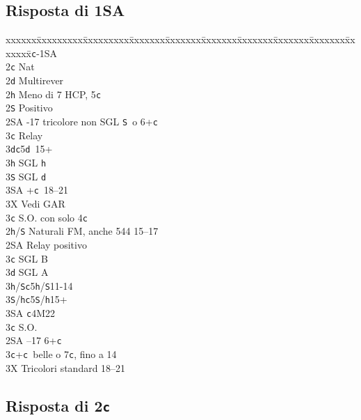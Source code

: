 \documentclass[a4paper,italian]{article}
\newcommand{\BS}{\small{\texttt{S}}}
\newcommand{\BC}{\small{\texttt{c}}}
\newcommand{\BD}{\small{\texttt{d}}}
\newcommand{\BH}{\small{\texttt{h}}}
\newcommand{\pdfc}{\texorpdfstring{\texttt{c}}{C}}
\newenvironment{bidtable}
{\begin{tabbing}

    xxxxxx\=xxxxxxxxx\=xxxxxxxxx\=xxxxxxx\=xxxxxxx\=xxxxxxx\=xxxxxxx\=xxxxxxx\=xxxxxxx\=xxxxxxx\=\kill}
{\end{tabbing} }%
\begin{document}
\begin{multicols}{2}
    \subsection{Risposta di 1SA}

    \begin{bidtable}
        1\BC-1\small{SA}\+\\
        2\BC \> Nat\\
        2\BD \> Multirever\+\\
        2\BH \> Meno di 7 HCP, 5\BC \\
        2\BS \> Positivo\+\\
        2\small{SA} -17 tricolore non SGL \BS\ o 6+\BC \+\\
        3\BC \> Relay\+\\
        3\BD {}\BC5\BD\ 15+\\
        3\BH \> SGL \BH \\
        3\BS \> SGL \BD \\
        3\small{SA} +\BC\ 18--21\-\-\\
        3X \> Vedi GAR\-\\
        3\BC \> S.O. con solo 4\BC\-\\
        2\BH/\BS \> Naturali FM, anche 544 15--17\+\\
        2\small{SA} \> Relay positivo\+\\
        3\BC \> SGL B\\
        3\BD \> SGL A\\
        3\BH/\BS {}\BC 5\BH/\BS 11-14\\
        3\BS/\BH {}\BC 5\BS/\BH 15+\\
        3\small{SA} \BC 4M22\-\\
        3\BC \> S.O.\-\\
        2\small{SA} --17 6+\BC \\
        3\BC {}+\BC\ belle o 7\BC , fino a 14\\
        3X \> Tricolori standard 18--21\-
    \end{bidtable}
\end{multicols}

\newpage

\subsection{Risposta di 2\pdfc}
\end{document}
